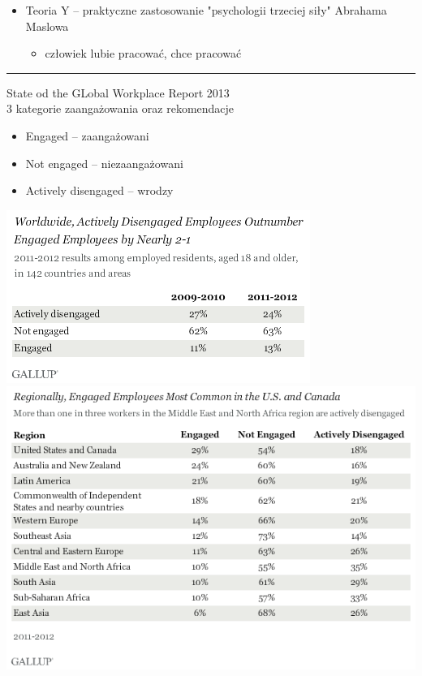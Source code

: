 \documentclass[a4paper,10pt]{report}
\begin{document}
\begin{itemize}
	\item Teoria Y -- praktyczne zastosowanie "psychologii trzeciej siły" Abrahama Maslowa
	\begin{itemize}
		\item człowiek lubie pracować, chce pracować
	\end{itemize}
\end{itemize}

\noindent\rule{\textwidth}{1.pt}

State od the GLobal Workplace Report 2013 \\
3 kategorie zaangażowania oraz rekomendacje
\begin{itemize}
	\item Engaged -- zaangażowani
	\item Not engaged -- niezaangażowani
	\item Actively disengaged -- wrodzy
\end{itemize}
\begin{center}
\includegraphics[scale=0.9]{assets/workplacereport}\\
\includegraphics[scale=0.8]{assets/workplacereport2}\\
\end{center}
\end{document}
